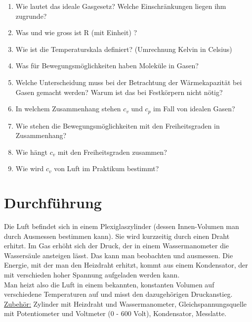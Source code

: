 \begin{enumerate}
 \item Wie lautet das ideale Gasgesetz? Welche Einschränkungen liegen ihm zugrunde?
 \item Was und wie gross ist R (mit Einheit) ?
 \item Wie ist die Temperaturskala definiert? (Umrechnung Kelvin in Celsius)
 \item Was für Bewegungsmöglichkeiten haben Moleküle in Gasen?
 \item Welche Unterscheidung muss bei der Betrachtung der Wärmekapazität bei Gasen gemacht werden? Warum ist das bei Festkörpern nicht nötig?
 \item In welchem Zusammenhang stehen $c_v$ und $c_p$ im Fall von idealen Gasen?
 \item Wie stehen die Bewegungsmöglichkeiten mit den Freiheitsgraden in Zusammenhang?
 \item Wie hängt $c_v$ mit den Freiheitsgraden zusammen?
 \item Wie wird $c_v$ von Luft im Praktikum bestimmt?
\end{enumerate}

\section{Durchführung} 

Die Luft befindet sich in einem Plexiglaszylinder (dessen Innen-Volumen man durch Ausmessen bestimmen kann). Sie wird kurzzeitig durch einen Draht erhitzt. Im Gas erhöht sich der Druck, der in einem Wassermanometer die Wassersäule ansteigen lässt. Das kann man beobachten und ausmessen. Die Energie, mit der man den Heizdraht erhitzt, kommt aus einem Kondensator, der mit verschieden hoher Spannung aufgeladen werden kann.\\
Man heizt also die Luft in einem bekannten, konstanten Volumen auf verschiedene Temperaturen auf und misst den dazugehörigen Druckanstieg.\\

\underline{Zubehör:} Zylinder mit Heizdraht und Wassermanometer, Gleichspannungsquelle mit Potentiometer und Voltmeter (0 - 600 Volt), Kondensator, Messlatte.

